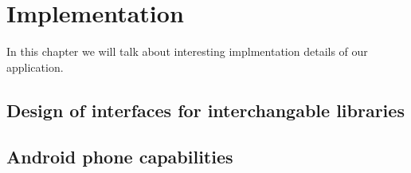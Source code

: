 \chapter{Implementation}

In this chapter we will talk about interesting implmentation details of
our application.

\section{Design of interfaces for interchangable libraries}

\section{Android phone capabilities}

